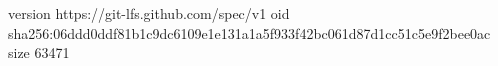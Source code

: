 version https://git-lfs.github.com/spec/v1
oid sha256:06ddd0ddf81b1c9dc6109e1e131a1a5f933f42bc061d87d1cc51c5e9f2bee0ac
size 63471
